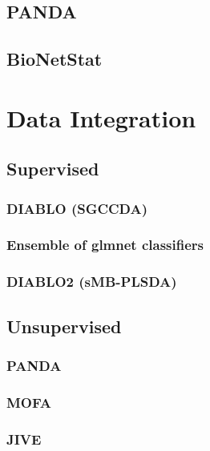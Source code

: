 \documentclass[]{book}
\begin{document}
\section{PANDA}\label{panda}

\section{BioNetStat}\label{bionetstat}

\chapter{Data Integration}\label{data-integration}

\section{Supervised}\label{supervised}

\subsection{DIABLO (SGCCDA)}\label{diablo-sgccda}

\subsection{Ensemble of glmnet
classifiers}\label{ensemble-of-glmnet-classifiers}

\subsection{DIABLO2 (sMB-PLSDA)}\label{diablo2-smb-plsda}

\section{Unsupervised}\label{unsupervised}

\subsection{PANDA}\label{panda-1}

\subsection{MOFA}\label{mofa}

\subsection{JIVE}\label{jive}
\end{document}
